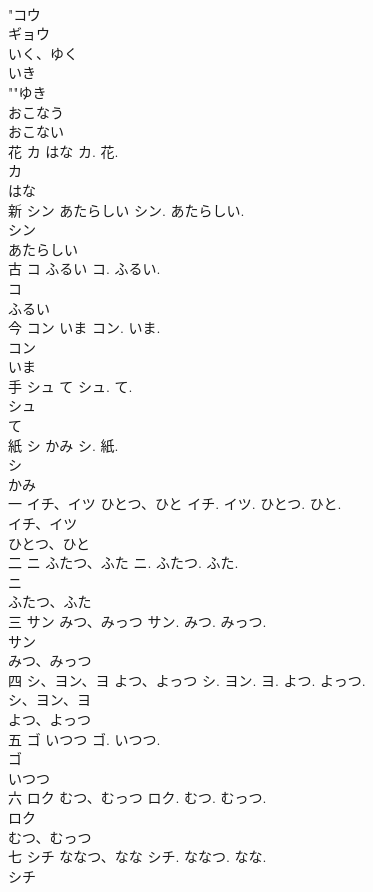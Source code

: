 \documentclass[8pt]{extreport}
\begin{document}
\begin{CJK}{UTF8}{min}
\\	"コウ
\\	ギョウ
\\	いく、ゆく
\\	いき
\\	""ゆき
\\	おこなう
\\	おこない
\\	花	カ はな	カ. 花.	
\\	カ
\\	はな
\\	新	シン あたらしい	シン. あたらしい.	
\\	シン
\\	あたらしい
\\	古	コ ふるい	コ. ふるい.	
\\	コ
\\	ふるい
\\	今	コン いま	コン. いま.	
\\	コン
\\	いま
\\	手	シュ て	シュ. て.	
\\	シュ
\\	て
\\	紙	シ かみ	シ. 紙.	
\\	シ
\\	かみ
\\	一	イチ、イツ ひとつ、ひと	イチ. イツ. ひとつ. ひと.	
\\	イチ、イツ
\\	ひとつ、ひと
\\	二	ニ ふたつ、ふた	ニ. ふたつ. ふた.	
\\	ニ
\\	ふたつ、ふた
\\	三	サン みつ、みっつ	サン. みつ. みっつ.	
\\	サン
\\	みつ、みっつ
\\	四	シ、ヨン、ヨ よつ、よっつ	シ. ヨン. ヨ. よつ. よっつ.	
\\	シ、ヨン、ヨ
\\	よつ、よっつ
\\	五	ゴ いつつ	ゴ. いつつ.	
\\	ゴ
\\	いつつ
\\	六	ロク むつ、むっつ	ロク. むつ. むっつ.	
\\	ロク
\\	むつ、むっつ
\\	七	シチ ななつ、なな	シチ. ななつ. なな.	
\\	シチ

\end{CJK}
\end{document}

